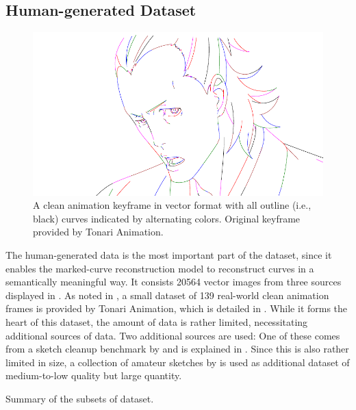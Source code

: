 \subsection{Human-generated Dataset}
\label{subsec:dataset.human}
\begin{figure}[h]
    \centering
        \includegraphics[width=\textwidth]{graphics/douga/49-alternating}
    \caption{A clean animation keyframe in vector format with all outline (i.e., black) curves indicated by alternating colors. Original keyframe provided by Tonari Animation.}
    \label{fig:douga.alternating}
\end{figure}

The human-generated data is the most important part of the dataset, since it enables the marked-curve reconstruction model to reconstruct curves in a semantically meaningful way. It consists 20564 vector images from three sources displayed in . As noted in , a small dataset of 139 real-world clean animation frames is provided by Tonari Animation, which is detailed in . While it forms the heart of this dataset, the amount of data is rather limited, necessitating additional sources of data. Two additional sources are used: One of these comes from a sketch cleanup benchmark by \citet{Yan:2020:ABR} and is explained in . Since this is also rather limited in size, a collection of amateur sketches by \citet{eitz2012hdhso} is used as additional dataset of medium-to-low quality but large quantity.

\begin{table}[]
    \centering
    
    \caption{Summary of the subsets of dataset.}
    \label{tab:data.subsets}
\end{table}

